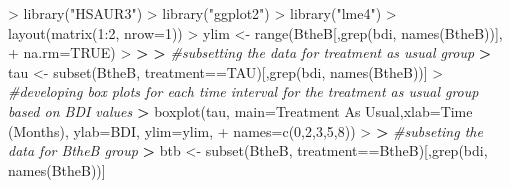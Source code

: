 \documentclass[
]{article}
\newenvironment{Shaded}{\begin{snugshade}}{\end{snugshade}}
\newcommand{\AttributeTok}[1]{\textcolor[rgb]{0.77,0.63,0.00}{#1}}
\newcommand{\CommentTok}[1]{\textcolor[rgb]{0.56,0.35,0.01}{\textit{#1}}}
\newcommand{\ConstantTok}[1]{\textcolor[rgb]{0.00,0.00,0.00}{#1}}
\newcommand{\DecValTok}[1]{\textcolor[rgb]{0.00,0.00,0.81}{#1}}
\newcommand{\ErrorTok}[1]{\textcolor[rgb]{0.64,0.00,0.00}{\textbf{#1}}}
\newcommand{\FunctionTok}[1]{\textcolor[rgb]{0.00,0.00,0.00}{#1}}
\newcommand{\NormalTok}[1]{#1}
\newcommand{\OtherTok}[1]{\textcolor[rgb]{0.56,0.35,0.01}{#1}}
\newcommand{\SpecialCharTok}[1]{\textcolor[rgb]{0.00,0.00,0.00}{#1}}
\newcommand{\StringTok}[1]{\textcolor[rgb]{0.31,0.60,0.02}{#1}}
\begin{document}
\begin{Shaded}
\begin{Highlighting}[]
\SpecialCharTok{\textgreater{}} \FunctionTok{library}\NormalTok{(}\StringTok{"HSAUR3"}\NormalTok{)}
\SpecialCharTok{\textgreater{}} \FunctionTok{library}\NormalTok{(}\StringTok{"ggplot2"}\NormalTok{)}
\SpecialCharTok{\textgreater{}} \FunctionTok{library}\NormalTok{(}\StringTok{"lme4"}\NormalTok{)}
\SpecialCharTok{\textgreater{}} \FunctionTok{layout}\NormalTok{(}\FunctionTok{matrix}\NormalTok{(}\DecValTok{1}\SpecialCharTok{:}\DecValTok{2}\NormalTok{, }\AttributeTok{nrow=}\DecValTok{1}\NormalTok{))}
\SpecialCharTok{\textgreater{}}\NormalTok{ ylim }\OtherTok{\textless{}{-}} \FunctionTok{range}\NormalTok{(BtheB[,}\FunctionTok{grep}\NormalTok{(}\StringTok{\textquotesingle{}bdi\textquotesingle{}}\NormalTok{, }\FunctionTok{names}\NormalTok{(BtheB))],}
\SpecialCharTok{+}               \AttributeTok{na.rm=}\ConstantTok{TRUE}\NormalTok{)}
\SpecialCharTok{\textgreater{}} 
\ErrorTok{\textgreater{}} 
\ErrorTok{\textgreater{}} \CommentTok{\#subsetting the data for treatment as usual group}
\ErrorTok{\textgreater{}}\NormalTok{ tau }\OtherTok{\textless{}{-}} \FunctionTok{subset}\NormalTok{(BtheB, treatment}\SpecialCharTok{==}\StringTok{\textquotesingle{}TAU\textquotesingle{}}\NormalTok{)[,}\FunctionTok{grep}\NormalTok{(}\StringTok{\textquotesingle{}bdi\textquotesingle{}}\NormalTok{, }\FunctionTok{names}\NormalTok{(BtheB))]}
\SpecialCharTok{\textgreater{}} \CommentTok{\#developing box plots for each time interval for the treatment as usual group based on BDI values}
\ErrorTok{\textgreater{}} \FunctionTok{boxplot}\NormalTok{(tau, }\AttributeTok{main=}\StringTok{\textquotesingle{}Treatment As Usual\textquotesingle{}}\NormalTok{,}\AttributeTok{xlab=}\StringTok{\textquotesingle{}Time (Months)\textquotesingle{}}\NormalTok{, }\AttributeTok{ylab=}\StringTok{\textquotesingle{}BDI\textquotesingle{}}\NormalTok{, }\AttributeTok{ylim=}\NormalTok{ylim, }
\SpecialCharTok{+} \AttributeTok{names=}\FunctionTok{c}\NormalTok{(}\DecValTok{0}\NormalTok{,}\DecValTok{2}\NormalTok{,}\DecValTok{3}\NormalTok{,}\DecValTok{5}\NormalTok{,}\DecValTok{8}\NormalTok{))}
\SpecialCharTok{\textgreater{}} 
\ErrorTok{\textgreater{}} \CommentTok{\#subseting the data for BtheB group}
\ErrorTok{\textgreater{}}\NormalTok{ btb }\OtherTok{\textless{}{-}} \FunctionTok{subset}\NormalTok{(BtheB, treatment}\SpecialCharTok{==}\StringTok{\textquotesingle{}BtheB\textquotesingle{}}\NormalTok{)[,}\FunctionTok{grep}\NormalTok{(}\StringTok{\textquotesingle{}bdi\textquotesingle{}}\NormalTok{, }\FunctionTok{names}\NormalTok{(BtheB))]}

\end{Highlighting}
\end{Shaded}
\end{document}
